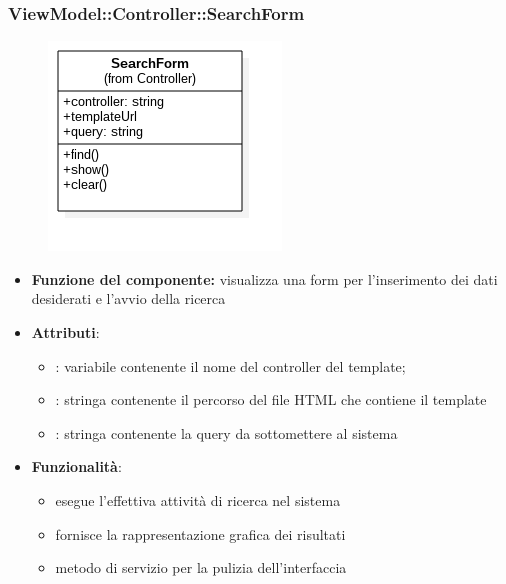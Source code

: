  \subsubsection{ViewModel::Controller::SearchForm}
 \begin{figure}[h!]
\begin{center}
	\includegraphics[scale=0.6]{../images/ViewModel/Controller/SearchForm.png}
\end{center}
\end{figure}
 \begin{itemize}
 \item\textbf{Funzione del componente:} visualizza una form per l’inserimento dei dati desiderati e l’avvio della ricerca
 \item\textbf{Attributi}:
 	\begin{itemize}
 		\item{}: variabile contenente il nome del controller del template;\\
		
		\item{}: stringa contenente il percorso del file HTML che contiene il template\\
		\item{}: stringa contenente la query da sottomettere al sistema\\
 	\end{itemize}
 	\item\textbf{Funzionalità}:
 	\begin{itemize}
 		\item{} esegue l'effettiva attività di ricerca nel sistema\\
		\item{} fornisce la rappresentazione grafica dei risultati\\
		\item{} metodo di servizio per la pulizia dell'interfaccia\\
 	\end{itemize}
 \end{itemize}
\newpage
 
